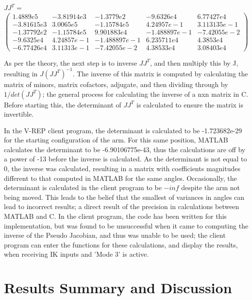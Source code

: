 \documentclass[12pt,openany,a4paper]{book}
\begin{document}
$J J^T = $
$ \left(\begin{array}{ccccc} 
1.4889e5 & -3.81914e3 & -1.3779e2 & -9.6326e4 & 6.77427e4 \\ 
-3.81615e3 & 3.0065e5 & -1.15784e5 & 4.24957e-1 & 3.113135e-1 \\ 
-1.37792e2 & -1.15784e5 & 9.901883e4 & -1.488897e-1 & -7.42055e-2 \\ -9.6325e4 & 4.24857e-1 & -1.488897e-1 & 6.235711e4 & 4.3853e4 \\
-6.77426e4 & 3.11313e-1 & -7.42055e-2 & 4.38533e4 & 3.08403e4 

\end{array}\right)
$

As per the theory, the next step is to inverse $J J^T$, and then multiply this by J, resulting in $J (J J^T)^{-1}$. The inverse of this matrix is computed by calculating the matrix of minors, matrix cofactors, adjugate, and then dividing through by $1/det(JJ^T)$; the general process for calculating the inverse of a nxn matrix in C. Before starting this, the determinant of $J J^T$ is calculated to ensure the matrix is invertible.

In the V-REP client program, the determinant is calculated to be -1.723682e-29 for the starting configuration of the arm. For this same position, MATLAB calculates the determinant to be -6.90106775e-43, thus the calculations are off by a power of -13 before the inverse is calculated. As the determinant is not equal to 0, the inverse was calculated, resulting in a matrix with coefficients magnitudes different to that computed in MATLAB for the same angles. Occasionally, the determinant is calculated in the client program to be $-inf$ despite the arm not being moved. This leads to the belief that the smallest of variances in angles can lead to incorrect results; a direct result of the precision in calculations between MATLAB and C. In the client program, the code has been written for this implementation, but was found to be unsuccessful when it came to computing the inverse of the Pseudo Jacobian, and thus was unable to be used; the client program can enter the functions for these calculations, and display the results, when receiving IK inputs and 'Mode 3' is active.


\chapter{Results Summary and Discussion}
\end{document}

